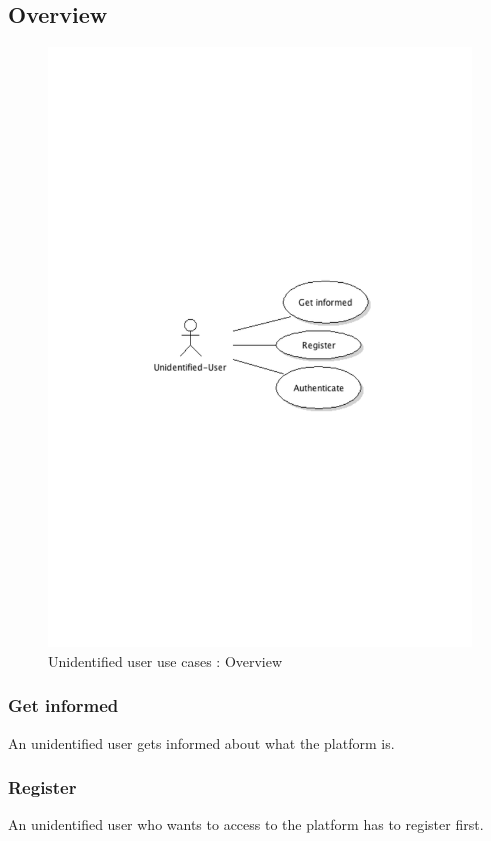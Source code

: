 	\subsection{Overview}
		\begin{figure}[ht]
			\begin{center}
				\includegraphics[width=\textwidth,  trim=2cm 12cm 2cm 11cm]{UML_figure/UC/uni_user/UC_UniUser_General.pdf}
				\caption{Unidentified user use cases : Overview}
			\end{center}
		\end{figure}
		\subsubsection{Get informed}An unidentified user gets informed about what the platform is.
		\subsubsection{Register}An unidentified user who wants to access to the platform has to register first.
